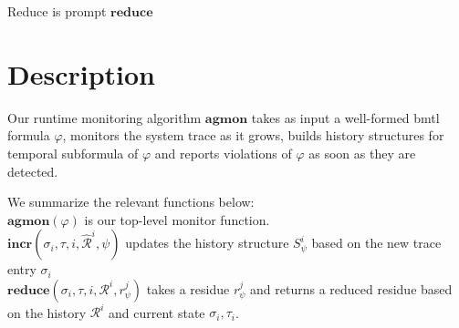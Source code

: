 \documentclass[10pt,a4paper]{article}
\newcommand{\res}[2]{\ensuremath{r_{#1}^{#2}}}
\begin{document}
Reduce is prompt $\mathbf{reduce}$


\section{Description}
Our runtime monitoring algorithm $\mathbf{agmon}$ takes as input a well-formed bmtl formula $\varphi$, monitors the system trace as it grows, builds history structures for temporal subformula of $\varphi$ and reports violations of $\varphi$ as soon as they are detected.

We summarize the relevant functions below: \\
$\mathbf{agmon}(\varphi)$ is our top-level monitor function. \\
$\mathbf{incr}(\sigma_i, \tau, i, \hat{\mathcal{R}}^i, \psi)$ updates the history structure $S^i_{\psi}$ based on the new trace entry $\sigma_i$ \\ 
$\mathbf{reduce}(\sigma_i,\tau, i, \mathcal{R}^i, \res{\psi}{j})$ takes a residue $\res{\psi}{j}$ and returns a reduced residue based on the history $\mathcal{R}^i$ and current state $\sigma_i, \tau_i$. 
\end{document}
